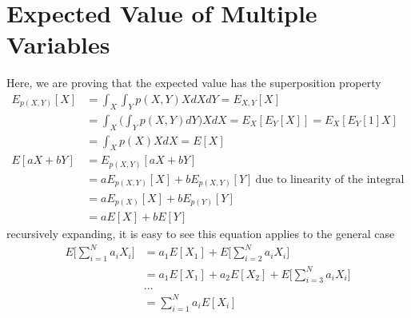 \documentclass{book}
\numberwithin{equation}{subsection}
\begin{document}
\section{Expected Value of Multiple Variables}
\label{multi_mean_derivation}
Here, we are proving that the expected value has the superposition property
\begin{align}
     E_{p(X,Y)}[X] 
     &= \int_X\int_Y p(X,Y)X dX dY = E_{X,Y}[X]\\
     &= \int_X\Big(\int_Y p(X,Y)dY\Big) X dX = E_{X}[E_{Y}[X]] = E_{X}[E_{Y}[1]X]\\
     &= \int_X p(X) X dX = E[X]\\
    E[aX+bY] 
    &= E_{p(X,Y)}[aX+bY]\\
    &= aE_{p(X,Y)}[X]+bE_{p(X,Y)}[Y]\ \text{due to linearity of the integral}\\
    &= aE_{p(X)}[X]+bE_{p(Y)}[Y]\\
    &= aE[X]+bE[Y]
\end{align}
recursively expanding, it is easy to see this equation applies to the general case
\begin{align}
    E\big[\sum_{i=1}^N a_iX_i\big] &= a_1E[X_1]+E\big[\sum_{i=2}^N a_iX_i\big]\\
    &= a_1E[X_1]+a_2E[X_2]+E\big[\sum_{i=3}^N a_iX_i\big]\\
    & ...\\
    &= \sum_{i=1}^N a_iE[X_i]~\label{mean_superpos}
\end{align}
\end{document}
